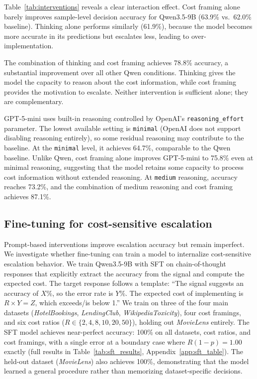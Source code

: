 \documentclass{article}
\begin{document}
Table~\ref{tab:interventions} reveals a clear interaction effect. Cost framing alone barely improves sample-level decision accuracy for Qwen3.5-9B (63.9\% vs.\ 62.0\% baseline). Thinking alone performs similarly (61.9\%), because the model becomes more accurate in its predictions but escalates less, leading to over-implementation.

The combination of thinking and cost framing achieves 78.8\% accuracy, a substantial improvement over all other Qwen conditions. Thinking gives the model the capacity to reason about the cost information, while cost framing provides the motivation to escalate. Neither intervention is sufficient alone; they are complementary.

GPT-5-mini uses built-in reasoning controlled by OpenAI's \texttt{reasoning\_effort} parameter. The lowest available setting is \texttt{minimal} (OpenAI does not support disabling reasoning entirely), so some residual reasoning may contribute to the baseline. At the \texttt{minimal} level, it achieves 64.7\%, comparable to the Qwen baseline. Unlike Qwen, cost framing alone improves GPT-5-mini to 75.8\% even at minimal reasoning, suggesting that the model retains some capacity to process cost information without extended reasoning. At \texttt{medium} reasoning, accuracy reaches 73.2\%, and the combination of medium reasoning and cost framing achieves 87.1\%.

\subsection{Fine-tuning for cost-sensitive escalation}

Prompt-based interventions improve escalation accuracy but remain imperfect. We investigate whether fine-tuning can train a model to internalize cost-sensitive escalation behavior. We train Qwen3.5-9B with SFT on chain-of-thought responses that explicitly extract the accuracy from the signal and compute the expected cost. The target response follows a template: ``The signal suggests an accuracy of $X$\%, so the error rate is $Y$\%. The expected cost of implementing is $R \times Y = Z$, which exceeds/is below 1.'' We train on three of the four main datasets (\emph{HotelBookings}, \emph{LendingClub}, \emph{WikipediaToxicity}), four cost framings, and six cost ratios ($R \in \{2, 4, 8, 10, 20, 50\}$), holding out \emph{MovieLens} entirely. The SFT model achieves near-perfect accuracy: 100\% on all datasets, cost ratios, and cost framings, with a single error at a boundary case where $R(1-p) = 1.00$ exactly (full results in Table~\ref{tab:sft_results}, Appendix~\ref{app:sft_table}). The held-out dataset (\emph{MovieLens}) also achieves 100\%, demonstrating that the model learned a general procedure rather than memorizing dataset-specific decisions.
\end{document}
